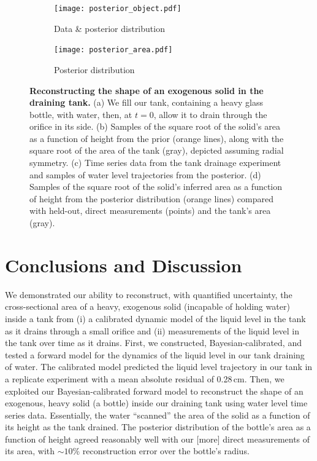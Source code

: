 \documentclass[openacc]{rsproca_new}%
\begin{document}
\begin{figure}[h!]
     \begin{subfigure}[b]{0.49\textwidth}
    	\texttt{[image: posterior\_object.pdf]}
	\caption{Data \& posterior distribution} \label{fig:posterior_object}
    \end{subfigure}
    \begin{subfigure}[b]{0.49\textwidth}
    	\texttt{[image: posterior\_area.pdf]}
	\caption{Posterior distribution} \label{fig:posterior_area}
    \end{subfigure}
    \caption{
      \textbf{Reconstructing the shape of an exogenous solid in the draining tank.} 
      (a) We fill our tank, containing a heavy glass bottle, with water, then, at $t=0$, allow it to drain through the orifice in its side.
      (b) Samples of the square root of the solid's area as a function of height from the prior (orange lines), along with the square root of the area of the tank (gray), depicted assuming radial symmetry.
      (c) Time series data from the tank drainage experiment and samples of water level trajectories from the posterior.
      (d) Samples of the square root of the solid's inferred area as a function of height from the posterior distribution (orange lines) compared with held-out, direct measurements (points) and the tank's area (gray).
      }
\end{figure}

\section{Conclusions and Discussion}
We demonstrated our ability to reconstruct, with quantified uncertainty, the cross-sectional area of a heavy, exogenous solid (incapable of holding water) inside a tank from (i) a calibrated dynamic model of the liquid level in the tank as it drains through a small orifice and (ii) measurements of the liquid level in the tank over time as it drains.
First, we constructed, Bayesian-calibrated, and tested a forward model for the dynamics of the liquid level in our tank draining of water.
The calibrated model predicted the liquid level trajectory in our tank in a replicate experiment with a mean absolute residual of 0.28\,cm.
Then, we exploited our Bayesian-calibrated forward model to reconstruct the shape of an exogenous, heavy solid (a bottle) inside our draining tank using water level time series data. 
Essentially, the water ``scanned'' the area of the solid as a function of its height as the tank drained. 
The posterior distribution of the bottle's area as a function of height agreed reasonably well with our [more] direct measurements of its area, with $\sim 10$\% reconstruction error over the bottle's radius. 
\end{document}
